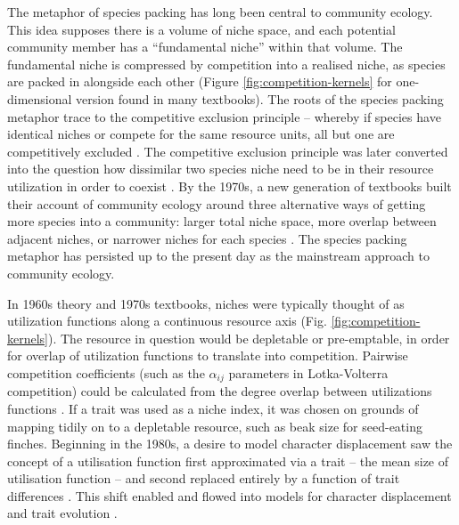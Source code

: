 \documentclass[a4paper,11pt]{article}
\begin{document}
The metaphor of species packing has long been central to community
ecology.  This idea supposes there is a volume of niche space, and
each potential community member has a ``fundamental niche'' within
that volume.  The fundamental niche is compressed by competition into
a realised niche, as species are packed in alongside each other
(Figure \ref{fig:competition-kernels} for one-dimensional version
found in many textbooks).
%
The roots of the species packing metaphor trace to the competitive
exclusion principle -- whereby if species have identical niches or
compete for the same resource units, all but one are
competitively excluded \citep{Lotka-1925, Volterra-1926, Gause-1934}.
The competitive exclusion principle was later converted into the
question how dissimilar two species niche need to be in their resource
utilization in order to coexist
\citep{MacArthur-1967, May-1972, Slatkin-1980}.
%
By the 1970s, a new generation of textbooks built their account of
community ecology around three alternative ways of getting more
species into a community: larger total niche space, more overlap
between adjacent niches, or narrower niches for each species
\citep{Whittaker-1970,Krebs-1972,Ricklefs-1973,Pianka-1974}. The
species packing metaphor has persisted up to the present day as the
mainstream approach to community ecology.

In 1960s theory and 1970s textbooks, niches were typically thought of
as utilization functions along a continuous resource axis
\citep{MacArthur-1967,Abrams-1975} (Fig. \ref{fig:competition-kernels}).
The resource in question would be depletable or pre-emptable, in order for
overlap of utilization functions to translate into
competition. Pairwise competition coefficients (such as the
$\alpha_{ij}$ parameters in Lotka-Volterra competition) could be
calculated from the degree overlap between utilizations functions
\citep{MacArthur-1967, May-1972, Abrams-1975,}.
If a trait was used as a niche index, it was chosen on grounds of
mapping tidily on to a depletable resource, such as beak size for
seed-eating finches.
Beginning in the 1980s, a desire to model
character displacement saw the concept of a utilisation function first
approximated via a trait -- the mean size of utilisation function
\citep {Roughgarden-1979} -- and second replaced entirely by a function
of trait differences \citep{Slatkin-1980,Taper-1985}. This shift enabled
and flowed into models for character displacement
\citep[e.g.,][]{Taper-1985, Case-2000, Goldberg-2006} and trait
evolution \citep{Brown-1987,Geritz-1998,Geritz-1999,Dieckmann-1999,
  Abrams-2001}.
\end{document}
